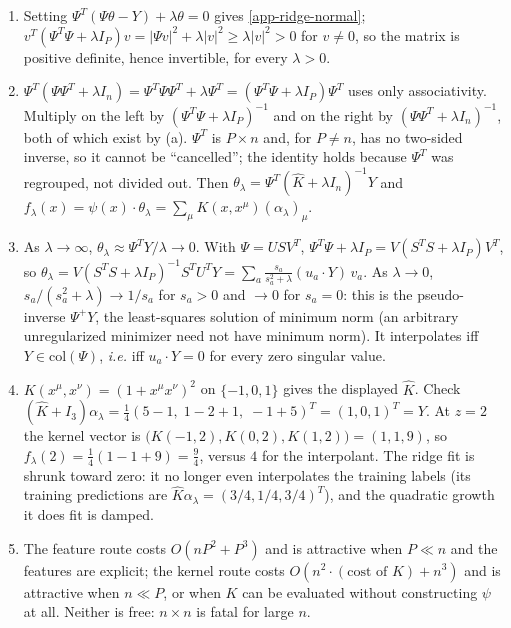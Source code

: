 \documentclass[11pt]{article}
\begin{document}
\begin{solution}
\begin{enumerate}
    \item Setting $\Psi^T(\Psi\theta-Y)+\lambda\theta = 0$ gives \eqref{app-ridge-normal}; $v^T(\Psi^T\Psi+\lambda I_P)v = |\Psi v|^2+\lambda|v|^2\geq\lambda|v|^2>0$ for $v\neq0$, so the matrix is positive definite, hence invertible, for every $\lambda>0$.
    \item $\Psi^T(\Psi\Psi^T+\lambda I_n) = \Psi^T\Psi\Psi^T+\lambda\Psi^T = (\Psi^T\Psi+\lambda I_P)\Psi^T$ uses only associativity. Multiply on the left by $(\Psi^T\Psi+\lambda I_P)^{-1}$ and on the right by $(\Psi\Psi^T+\lambda I_n)^{-1}$, both of which exist by (a). $\Psi^T$ is $P\times n$ and, for $P\neq n$, has no two-sided inverse, so it cannot be ``cancelled''; the identity holds because $\Psi^T$ was regrouped, not divided out. Then $\theta_\lambda = \Psi^T(\hat K+\lambda I_n)^{-1}Y$ and $f_\lambda(x) = \psi(x)\cdot\theta_\lambda = \sum_\mu K(x,x^\mu)(\alpha_\lambda)_\mu$.
    \item As $\lambda\to\infty$, $\theta_\lambda \approx \Psi^TY/\lambda\to 0$. With $\Psi = USV^T$, $\Psi^T\Psi+\lambda I_P = V(S^TS+\lambda I_P)V^T$, so $\theta_\lambda = V(S^TS+\lambda I_P)^{-1}S^TU^TY = \sum_a \frac{s_a}{s_a^2+\lambda}(u_a\cdot Y)\,v_a$. As $\lambda\to0$, $s_a/(s_a^2+\lambda)\to 1/s_a$ for $s_a>0$ and $\to 0$ for $s_a = 0$: this is the pseudo-inverse $\Psi^+Y$, the least-squares solution of minimum norm (an arbitrary unregularized minimizer need not have minimum norm). It interpolates iff $Y\in\mathrm{col}(\Psi)$, \emph{i.e.} iff $u_a\cdot Y = 0$ for every zero singular value.
    \item $K(x^\mu,x^\nu) = (1+x^\mu x^\nu)^2$ on $\{-1,0,1\}$ gives the displayed $\hat K$. Check $(\hat K+I_3)\alpha_\lambda = \frac{1}{4}(5-1,\;1-2+1,\;-1+5)^T = (1,0,1)^T = Y$. At $z=2$ the kernel vector is $\big(K(-1,2),K(0,2),K(1,2)\big) = (1,1,9)$, so $f_\lambda(2) = \frac{1}{4}(1-1+9) = \frac{9}{4}$, versus $4$ for the interpolant. The ridge fit is shrunk toward zero: it no longer even interpolates the training labels (its training predictions are $\hat K\alpha_\lambda = (3/4,1/4,3/4)^T$), and the quadratic growth it does fit is damped.
    \item The feature route costs $O(nP^2+P^3)$ and is attractive when $P\ll n$ and the features are explicit; the kernel route costs $O(n^2\cdot(\text{cost of }K)+n^3)$ and is attractive when $n\ll P$, or when $K$ can be evaluated without constructing $\psi$ at all. Neither is free: $n\times n$ is fatal for large $n$.
\end{enumerate}
\end{solution}
\end{document}
